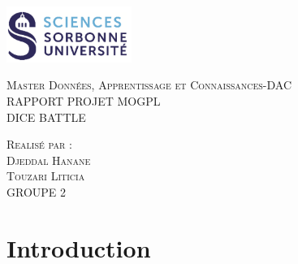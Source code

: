 \documentclass{article}
\begin{document}
\begin{titlepage}
    \begin{flushleft}
    \includegraphics[width=11em]{logo.png}\\[1.5cm]
    \end{flushleft}
    \begin{center}
        \textsc{{\LARGE \color{blue} Master Données, Apprentissage et Connaissances-DAC}}\\[4cm]
        \textsc{\Huge{RAPPORT PROJET MOGPL}}\\[1cm]
        \textsc{\Huge{DICE BATTLE}}\\[5.5cm]
        \begin{minipage}{1\textwidth}
            \begin{flushleft} \large
            \textsc{\LARGE{Realisé par :}}\\[0.5cm]
            \textsc{Djeddal Hanane}\\
            \textsc{Touzari Liticia}\\
            GROUPE 2\\
            \end{flushleft}
        \end{minipage}
        \vfill
    \end{center}
  \end{titlepage}
  
\maketitle
\tableofcontents					%


\newpage


\section{Introduction}
\end{document}
